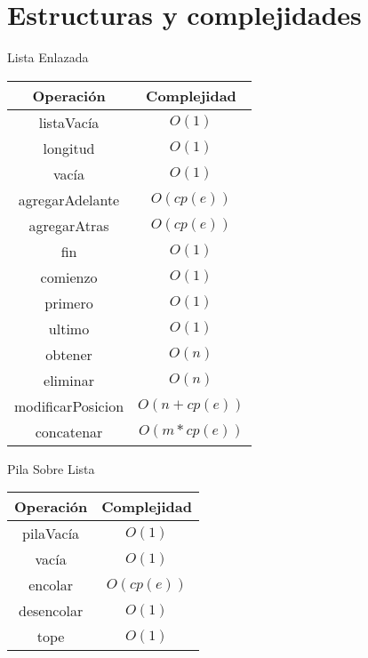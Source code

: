 \documentclass{article}
\begin{document}
\thispagestyle{empty}

\section*{Estructuras y complejidades}

\begin{multicols}{2}

\begin{center}
	\begin{large}Lista Enlazada\end{large}
	\vspace*{2mm}
	
	\begin{tabular}{|c|c|}
		\hline
		\textbf{Operación} & \textbf{Complejidad} \\
		\hline
		listaVacía & $O(1)$ \\
		longitud & $O(1)$ \\
		vacía & $O(1)$ \\
		agregarAdelante & $O(cp(e))$ \\
		agregarAtras & $O(cp(e))$ \\
		fin & $O(1)$ \\
		comienzo & $O(1)$ \\
		primero & $O(1)$ \\
		ultimo & $O(1)$ \\
		\hline
		obtener & $O(n)$ \\
		eliminar & $O(n)$ \\
		modificarPosicion & $O(n + cp(e))$ \\
		concatenar & $O(m * cp(e))$ \\
		\hline
	\end{tabular}
\end{center}


\begin{center}
	\begin{large}Pila Sobre Lista\end{large}
	\vspace*{2mm}
	
	\begin{tabular}{|c|c|}
		\hline
		\textbf{Operación} & \textbf{Complejidad} \\
		\hline
		pilaVacía & $O(1)$ \\
		vacía & $O(1)$ \\
		encolar & $O(cp(e))$ \\
		desencolar & $O(1)$ \\
		tope & $O(1)$ \\
		\hline
	\end{tabular}
\end{center}



\end{multicols}
\end{document}
